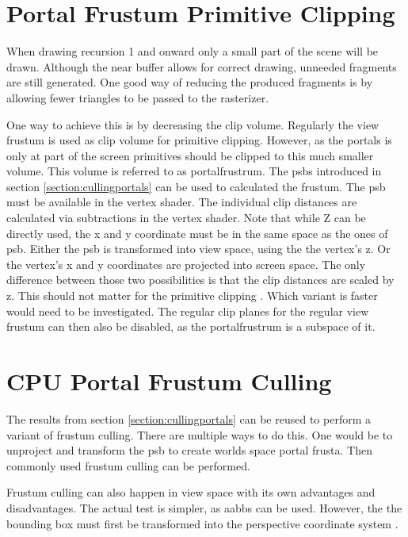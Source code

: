 \section{Portal Frustum Primitive Clipping}
\label{section:portalprimitiveclipping}

When drawing recursion 1 and onward only a small part of the scene will be drawn. Although the near buffer allows for correct drawing, unneeded fragments are still generated. One good way of reducing the produced fragments is by allowing fewer triangles to be passed to the rasterizer. 

One way to achieve this is by decreasing the clip volume. Regularly the view frustum is used as clip volume for primitive clipping. However, as the portals is only at part of the screen primitives should be clipped to this much smaller volume. This volume is referred to as \gls{portalfrustrum}. The \glspl{psb} introduced in section \ref{section:cullingportals} can be used to calculated the frustum. The \gls{psb} must be available in the vertex shader. The individual clip distances are calculated via subtractions in the vertex shader. Note that while Z can be directly used, the  x and y coordinate must be in the same space as the ones of \gls{psb}. Either the \gls{psb} is transformed into view space, using the the vertex's z. Or the vertex's x and y coordinates are projected into screen space. The only difference between those two possibilities is that the clip distances are scaled by z. This should not matter for the primitive clipping \cite{khronos:vulkan:spec1.1}.  Which variant is faster would need to be investigated. The regular clip planes for the regular view frustum can then also be disabled, as the \gls{portalfrustrum} is a subspace of it.

\section{CPU Portal Frustum Culling}
\label{section:portalfrustumculling}
The results from section \ref{section:cullingportals} can be reused to perform a variant of frustum culling. There are multiple ways to do this. One would be to unproject and transform the \gls{psb} to create worlds space portal frusta. Then commonly used frustum culling can be performed.

Frustum culling can also happen in view space  with its own advantages and disadvantages. The actual test is simpler, as \glspl{aabb} can be used. However, the the bounding box must first be transformed into the perspective coordinate system \cite{assarsson:2000:optimized}.


